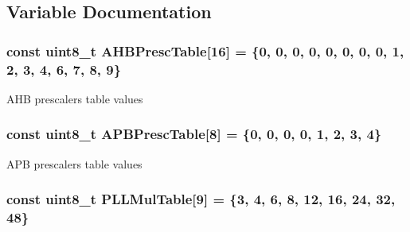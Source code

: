 \subsection{Variable Documentation}
\hypertarget{group___s_t_m32_l1xx___system___private___variables_ga6e1d9cd666f0eacbfde31e9932a93466}{
\subsubsection[{A\-H\-B\-Presc\-Table}]{\setlength{\rightskip}{0pt plus 5cm}const uint8\-\_\-t A\-H\-B\-Presc\-Table\mbox{[}16\mbox{]} = \{0, 0, 0, 0, 0, 0, 0, 0, 1, 2, 3, 4, 6, 7, 8, 9\}}}\label{group___s_t_m32_l1xx___system___private___variables_ga6e1d9cd666f0eacbfde31e9932a93466}
A\-H\-B prescalers table values \hypertarget{group___s_t_m32_l1xx___system___private___variables_ga5b4f8b768465842cf854a8f993b375e9}{
\subsubsection[{A\-P\-B\-Presc\-Table}]{\setlength{\rightskip}{0pt plus 5cm}const uint8\-\_\-t A\-P\-B\-Presc\-Table\mbox{[}8\mbox{]} = \{0, 0, 0, 0, 1, 2, 3, 4\}}}\label{group___s_t_m32_l1xx___system___private___variables_ga5b4f8b768465842cf854a8f993b375e9}
A\-P\-B prescalers table values \hypertarget{group___s_t_m32_l1xx___system___private___variables_gadab2d89c9fe6053f421278d154dcfb9d}{
\subsubsection[{P\-L\-L\-Mul\-Table}]{\setlength{\rightskip}{0pt plus 5cm}const uint8\-\_\-t P\-L\-L\-Mul\-Table\mbox{[}9\mbox{]} = \{3, 4, 6, 8, 12, 16, 24, 32, 48\}}}\label{group___s_t_m32_l1xx___system___private___variables_gadab2d89c9fe6053f421278d154dcfb9d}
